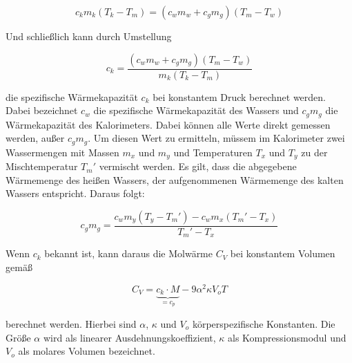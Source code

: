 \begin{equation*}
c_k m_k (T_k - T_m) = (c_w m_w + c_g m_g)(T_m - T_w)
\end{equation*} 

Und schließlich kann durch Umstellung

\begin{equation}
c_k = \frac{(c_w m_w + c_g m_g)(T_m -T_w)}{m_k(T_k - T_m)}
\label{eqn:KapProbe}
\end{equation}

die spezifische Wärmekapazität $c_k$ bei konstantem Druck
berechnet werden. Dabei bezeichnet $c_w$ die spezifische
Wärmekapazität des Wassers und $c_g m_g$ die Wärmekapazität
des Kalorimeters.
Dabei können alle Werte direkt gemessen werden, außer
$c_g m_g$. Um diesen Wert zu ermitteln, müssem im Kalorimeter
zwei Wassermengen mit Massen $m_x$ und $m_y$ und Temperaturen
$T_x$ und $T_y$ zu der Mischtemperatur $T_m\prime$ vermischt 
werden.
Es gilt, dass die abgegebene Wärmemenge des heißen Wassers, 
der aufgenommenen Wärmemenge des kalten Wassers entspricht.
Daraus folgt: 

\begin{equation}
c_g m_g = \frac{c_w m_y(T_y - T_m\prime)- c_w m_x(T_m\prime - T_x)}{T_m\prime - T_x}
\label{eqn:KapKalori}
\end{equation}

Wenn $c_k$ bekannt ist, kann daraus die Molwärme $C_V$ bei 
konstantem Volumen gemäß 

\begin{equation}
C_V = \underbrace{c_k \cdot M}_{=c_p} - 9 \alpha ^2 \kappa V_o T
\label{eqn:Molwaerme2}
\end{equation}

berechnet werden. Hierbei sind $\alpha$, $\kappa$ und $V_o$
körperspezifische Konstanten. Die Größe $\alpha$ wird als
linearer Ausdehnungskoeffizient, $\kappa$ als Kompressionsmodul
und $V_o$ als molares Volumen bezeichnet.

